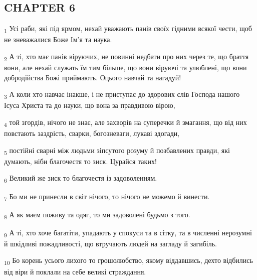 \subsection{CHAPTER 6}
\begin{tcolorbox}
\textsubscript{1} Усі раби, які під ярмом, нехай уважають панів своїх гідними всякої чести, щоб не зневажалися Боже Ім'я та наука.
\end{tcolorbox}
\begin{tcolorbox}
\textsubscript{2} А ті, хто має панів віруючих, не повинні недбати про них через те, що браття вони, але нехай служать їм тим більше, що вони віруючі та улюблені, що вони добродійства Божі приймають. Оцього навчай та нагадуй!
\end{tcolorbox}
\begin{tcolorbox}
\textsubscript{3} А коли хто навчає інакше, і не приступає до здорових слів Господа нашого Ісуса Христа та до науки, що вона за правдивою вірою,
\end{tcolorbox}
\begin{tcolorbox}
\textsubscript{4} той згордів, нічого не знає, але захворів на суперечки й змагання, що від них повстають заздрість, сварки, богозневаги, лукаві здогади,
\end{tcolorbox}
\begin{tcolorbox}
\textsubscript{5} постійні сварні між людьми зіпсутого розуму й позбавлених правди, які думають, ніби благочестя то зиск. Цурайся таких!
\end{tcolorbox}
\begin{tcolorbox}
\textsubscript{6} Великий же зиск то благочестя із задоволенням.
\end{tcolorbox}
\begin{tcolorbox}
\textsubscript{7} Бо ми не принесли в світ нічого, то нічого не можемо й винести.
\end{tcolorbox}
\begin{tcolorbox}
\textsubscript{8} А як маєм поживу та одяг, то ми задоволені будьмо з того.
\end{tcolorbox}
\begin{tcolorbox}
\textsubscript{9} А ті, хто хоче багатіти, упадають у спокуси та в сітку, та в численні нерозумні й шкідливі пожадливості, що втручають людей на загладу й загибіль.
\end{tcolorbox}
\begin{tcolorbox}
\textsubscript{10} Бо корень усього лихого то грошолюбство, якому віддавшись, дехто відбились від віри й поклали на себе великі страждання.
\end{tcolorbox}
